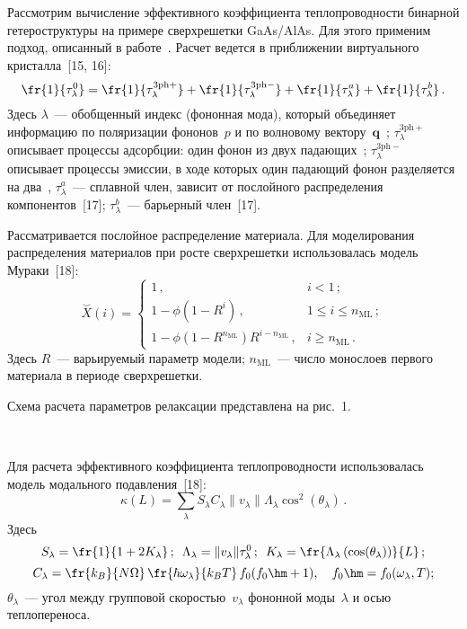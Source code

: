 \begin{multicols}{2}
    Рассмотрим вычисление эффективного коэффициента теплопроводности 
бинарной гетероструктуры на примере сверхрешетки GaAs/AlAs. Для этого 
применим подход, описанный в работе~\cite{8-ab}. Расчет ведется в 
приближении виртуального кристалла~[15, 16]: 
    $$
    \fr{1}{\tau^0_\lambda}=\fr{1}{\tau_\lambda^{3\mathrm{ph}+}}+\fr{1} 
{\tau_\lambda^{3\mathrm{ph}-}}+\fr{1}{\tau^a_\lambda} +\fr{1}{\tau^b_\lambda}\,.
    $$
    Здесь $\lambda$~--- обобщенный индекс (фононная мода), который 
объединяет информацию по поляризации фононов~$p$ и по волновому 
вектору~$\mathbf{q}$~\cite{16-ab}; $\tau_\lambda^{3\mathrm{ph}+}$ описывает процессы 
адсорбции: один фонон из двух падающих~\cite{15-ab, 16-ab}; 
$\tau_\lambda^{3\mathrm{ph}-}$ описывает процессы эмиссии, в ходе которых один 
падающий фонон разделяется на два~\cite{15-ab, 16-ab}, $\tau_\lambda^a$~--- 
сплавной член, зависит от послойного распределения компонентов~[17]; 
$\tau_\lambda^b$~--- барьерный член~[17].
    
    Рассматривается послойное распределение материала. Для моделирования 
распределения материалов при росте сверхрешетки использовалась модель 
Мураки~[18]:
    $$
    \overset{\smile}{X}(i)=\begin{cases}
    1\,, & i<1\,;\\
    1-\phi\left( 1-R^i\right)\,, & 1\leq i\leq n_{\mathrm{ML}}\,;\\
    1-\phi\left(1-R^{n_{\mathrm{ML}}}\right)R^{i-n_{\mathrm{ML}}}\,,& i\geq n_{\mathrm{ML}}\,.
    \end{cases}
    $$
    Здесь $R$~--- варьируемый параметр модели; $n_{\mathrm{ML}}$~--- число монослоев 
первого материала в периоде сверхрешетки.
    
    Схема расчета параметров релаксации пред\-став\-ле\-на на рис.~1.
    
     \begin{figure*} %
     \vspace*{1pt}
    \begin{center}  
  \mbox{%
 \epsfxsize=144.603mm 
 }
\end{center}
\vspace*{-11pt}
     \end{figure*}
     
    Для расчета эффективного коэффициента теп\-ло\-про\-вод\-ности 
использовалась модель модального подавления~[18]:
    $$
    \kappa(L)=\sum\limits_\lambda S_\lambda C_\lambda \| v_\lambda \| 
\Lambda_\lambda \cos^2\left(\theta_\lambda\right)\,.
    $$
Здесь 
$$
S_\lambda=\fr{1}{1+2K_\lambda}\,;\enskip 
\Lambda_\lambda= \| v_\lambda \| \tau^0_\lambda\,;\enskip 
K_\lambda=\fr{ \Lambda_\lambda \left(\cos(\theta_\lambda)\right)}{L}\,;
$$ 
\begin{equation*}
C_\lambda=\fr{k_B}{N\Omega}\,\fr{\hbar \omega_\lambda}{k_BT}\, 
f_0(f_0\hm+1),\quad
f_0\hm=f_0(\omega_\lambda, T);
\end{equation*} 
$\theta_\lambda$~--- угол между групповой скоростью~$v_\lambda$ 
фононной моды~$\lambda$ и осью теплопереноса.
    

\end{multicols}
